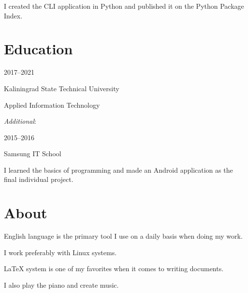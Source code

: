 \documentclass [12pt] {article}
\begin{document}
I created the CLI application in Python
and published it on the Python Package Index.

\section {Education}

2017--2021

Kaliningrad State Technical University

Applied Information Technology

\bigskip

\emph {Additional}:

2015--2016

Samsung IT School

I learned the basics of programming
and made an Android application as the final individual project.

\section {About}

English language is the primary tool
I use on a daily basis when doing my work.

I work preferably with Linux systems.

LaTeX system is one of my favorites
when it comes to writing documents.

I also play the piano and create music.
\end{document}
